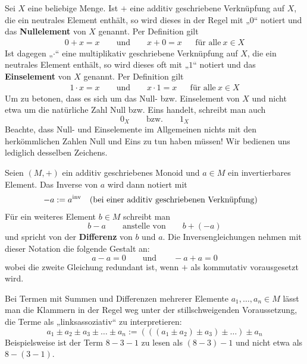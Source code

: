 \begin{nota}  
    Sei $X$ eine beliebige Menge. Ist $+$ eine additiv geschriebene Verknüpfung auf $X$, die ein neutrales Element enthält, so wird dieses in der Regel mit „$0$“ notiert und das \textbf{Nullelement} von $X$ genannt. Per Definition gilt
    \begin{align*}
        0 + x = x \qquad\text{und}\qquad x+0= x && \text{für alle}\ x\in X
    \end{align*}
    Ist dagegen „$\cdot$“ eine multiplikativ geschriebene Verknüpfung auf $X$, die ein neutrales Element enthält, so wird dieses oft mit „$1$“ notiert und das \textbf{Einselement} von $X$ genannt. Per Definition gilt
    \begin{align*}
        1 \cdot x = x \qquad\text{und}\qquad x\cdot 1= x && \text{für alle}\ x\in X
    \end{align*}
    Um zu betonen, dass es sich um das Null- bzw. Einselement von $X$ und nicht etwa um die natürliche Zahl Null bzw. Eins handelt, schreibt man auch
    \[ 0_X \qquad\text{bzw.}\qquad 1_X \]
    Beachte, dass Null- und Einselemente im Allgemeinen nichts mit den herkömmlichen Zahlen Null und Eins zu tun haben müssen! Wir bedienen uns lediglich desselben Zeichens.
\end{nota}


\begin{nota}[Differenzen] \label{differenz}
    Seien $(M,+)$ ein additiv geschriebenes Monoid und $a\in M$ ein invertierbares Element. Das Inverse von $a$ wird dann notiert mit
    \begin{align*}
        -a & := a^{\mathrm{inv}} && (\text{bei einer additiv geschriebenen Verknüpfung})
    \end{align*}
    Für ein weiteres Element $b\in M$ schreibt man
        \[ b-a \qquad\text{anstelle von}\qquad b + (-a) \]
    und spricht von der \textbf{Differenz} von $b$ und $a$. Die Inversengleichungen nehmen mit dieser Notation die folgende Gestalt an:
        \[ a-a = 0 \qquad\text{und}\qquad -a+a = 0 \]
    wobei die zweite Gleichung redundant ist, wenn $+$ als kommutativ vorausgesetzt wird.
    
    Bei Termen mit Summen und Differenzen mehrerer Elemente $a_1,\dots , a_n\in M$ lässt man die Klammern in der Regel weg unter der stillschweigenden Voraussetzung, die Terme als „linksassoziativ“ zu interpretieren:
        \[ a_1 \pm a_2\pm a_3\pm\ldots\pm a_n := (((a_1\pm a_2)\pm a_3) \pm \ldots ) \pm a_n\]
    Beispielsweise ist der Term $8-3-1$ zu lesen als $(8-3)-1$ und nicht etwa als $8-(3-1)$.
\end{nota}


